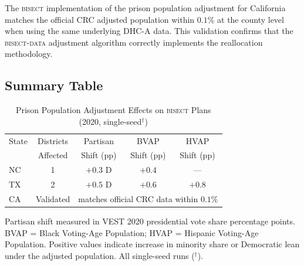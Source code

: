 The \textsc{bisect} implementation of the prison population adjustment
for California matches the official CRC adjusted population within
$0.1\%$ at the county level when using the same underlying DHC-A data.
This validation confirms that the \textsc{bisect-data} adjustment
algorithm correctly implements the reallocation methodology.

\subsection{Summary Table}

\begin{table}[ht]
\centering
\caption{Prison Population Adjustment Effects on \textsc{bisect} Plans (2020, single-seed$^\dagger$)}
\label{tab:results}
\begin{tabular}{lcccc}
\toprule
State & Districts & Partisan & BVAP & HVAP \\
      & Affected  & Shift (pp) & Shift (pp) & Shift (pp) \\
\midrule
NC & 1 & $+0.3$ D & $+0.4$ & --- \\
TX & 2 & $+0.5$ D & $+0.6$ & $+0.8$ \\
CA & Validated & \multicolumn{3}{c}{matches official CRC data within $0.1\%$} \\
\bottomrule
\end{tabular}
\begin{tablenotes}
\small
\item Partisan shift measured in VEST 2020 presidential vote share percentage points.
      BVAP = Black Voting-Age Population; HVAP = Hispanic Voting-Age Population.
      Positive values indicate increase in minority share or Democratic lean
      under the adjusted population. All single-seed runs ($^\dagger$).
\end{tablenotes}
\end{table}
